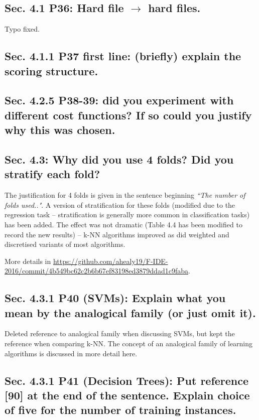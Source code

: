 \documentclass[]{article}
\begin{document}
\subsection{Sec. 4.1 P36: Hard file $\rightarrow$ hard files.}

Typo fixed.

\subsection{Sec. 4.1.1 P37 first line: (briefly) explain the scoring structure.}

\subsection{Sec. 4.2.5 P38-39: did you experiment with different cost functions? If so could you justify why this was chosen.}

\subsection{Sec. 4.3: Why did you use 4 folds? Did you stratify each fold?}

The justification for 4 folds is given in the sentence beginning \emph{``The number of folds used.."}. A version of stratification for these folds (modified due to the regression task -- stratification is generally more common in classification tasks) has been added. The effect was not dramatic (Table 4.4 has been modified to record the new results) -- k-NN algorithms improved as did weighted and discretised variants of most algorithms.

\sloppypar
More details in \url{https://github.com/ahealy19/F-IDE-2016/commit/4b549bc62c2b6b67ef83198ed3879ddad1c9faba}. 

\subsection{Sec. 4.3.1 P40 (SVMs): Explain what you mean by the analogical family (or just omit it).}

Deleted reference to analogical family when discussing SVMs, but kept the reference when comparing k-NN. 
The concept of an analogical family of learning algorithms is discussed in more detail here.

\subsection{Sec. 4.3.1 P41 (Decision Trees): Put reference [90] at the end of the sentence. Explain choice of five for the number of training instances.}
\end{document}
